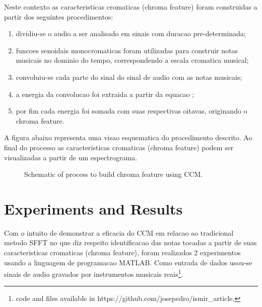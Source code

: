 \documentclass{article}
\begin{document}
	Neste contexto as caracteristicas cromaticas (chroma feature) foram construidas a partir dos seguintes procedimentos:
	\begin{enumerate}
		\item dividiu-se o audio a ser analisado em sinais com duracao pre-determinada;
		\item funcoes senoidais monocromaticas foram utilizadas para construir notas musicais no dominio do tempo, correspondendo a escala cromatica musical; 
		\item convoluiu-se cada parte do sinal do sinal de audio com as notas musicais;
		\item a energia da convolucao foi extraida a partir da equacao ;
		\item por fim cada energia foi somada com suas respectivas oitavas, originando o chroma feature.
	\end{enumerate}

	A figura abaixo representa uma visao esquematica do procedimento descrito. Ao final do processo as caracteristicas cromaticas (chroma feature) podem ser visualizadas a partir de um espectrograma.

	\begin{figure}[h]
	 \centerline{}
	 \caption{Schematic of process to build chroma feature using CCM.}
	 \label{fig:schematic}
	\end{figure}


\section{Experiments and Results}

	Com o intuito de demonstrar a eficacia do CCM em relacao ao tradicional metodo SFFT\cite{LabROSA} no que diz respeito identificacao das notas tocadas a partir de suas caracteristicas cromaticas (chroma feature),  foram realizados 2 experimentos usando a linguagem de programacao MATLAB. Como entrada de dados usou-se sinais de audio gravados por instrumentos musicais reais\footnote{code and files available in https://github.com/josepedro/ismir\_article.}. 
\end{document}
